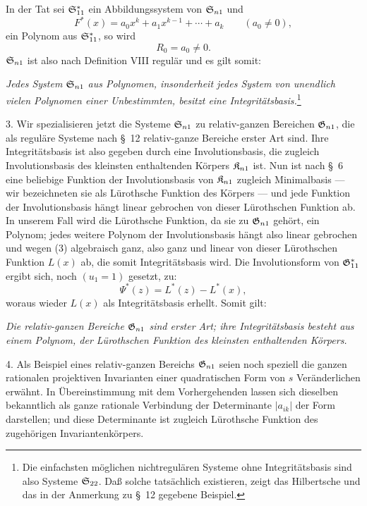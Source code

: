 In der Tat sei $\mathfrak{S}^*_{11}$ ein Abbildungssystem von $\mathfrak{S}_{n1}$ und
\[
  F^*(x)=a_0x^k+a_1x^{k-1}+\cdots+a_k\qquad(a_0\ne0),
\]
ein Polynom aus $\mathfrak{S}^*_{11}$, so wird
\begin{equation}
  R_0=a_0\ne0.
\tag{3}
\end{equation}
$\mathfrak{S}_{n1}$ ist also nach Definition VIII regulär und es gilt somit:

\emph{Jedes System $\mathfrak{S}_{n1}$ aus Polynomen, insonderheit jedes System von unendlich vielen Polynomen einer Unbestimmten, besitzt eine Integritätsbasis.}\footnote{Die einfachsten möglichen nichtregulären Systeme ohne Integritätsbasis sind also Systeme $\mathfrak{S}_{22}$. Daß solche tatsächlich existieren, zeigt das Hilbertsche und das in der Anmerkung zu \S\ 12 gegebene Beispiel.}

3. Wir spezialisieren jetzt die Systeme $\mathfrak{S}_{n1}$ zu relativ-ganzen Bereichen $\mathfrak{G}_{n1}$, die als reguläre Systeme nach \S\ 12 relativ-ganze Bereiche erster Art sind. Ihre Integritätsbasis ist also gegeben durch eine Involutionsbasis, die zugleich Involutionsbasis des kleinsten enthaltenden Körpers $\mathfrak{K}_{n1}$ ist. Nun ist nach \S\ 6 eine beliebige Funktion der Involutionsbasis von $\mathfrak{K}_{n1}$ zugleich Minimalbasis --- wir bezeichneten sie als Lürothsche Funktion des Körpers --- und jede Funktion der Involutionsbasis hängt linear gebrochen von dieser Lürothschen Funktion ab. In unserem Fall wird die Lürothsche Funktion, da sie zu $\mathfrak{G}_{n1}$ gehört, ein Polynom; jedes weitere Polynom der Involutionsbasis hängt also linear gebrochen und wegen (3) algebraisch ganz, also ganz und linear von dieser Lürothschen Funktion $L(x)$ ab, die somit Integritätsbasis wird. Die Involutionsform von $\mathfrak{G}^*_{11}$ ergibt sich, noch $(u_1=1)$ gesetzt, zu:
\[
  \Psi^*(z)=L^*(z)-L^*(x),
\]
woraus wieder $L(x)$ als Integritätsbasis erhellt. Somit gilt:

\emph{Die relativ-ganzen Bereiche $\mathfrak{G}_{n1}$ sind erster Art; ihre Integritätsbasis besteht aus einem Polynom, der Lürothschen Funktion des kleinsten enthaltenden Körpers.}

4. Als Beispiel eines relativ-ganzen Bereichs $\mathfrak{G}_{n1}$ seien noch speziell die ganzen rationalen projektiven Invarianten einer quadratischen Form von $s$ Veränderlichen erwähnt. In Übereinstimmung mit dem Vorhergehenden lassen sich dieselben bekanntlich als ganze rationale Verbindung der Determinante $|a_{ik}|$ der Form darstellen; und diese Determinante ist zugleich Lürothsche Funktion des zugehörigen Invariantenkörpers.


